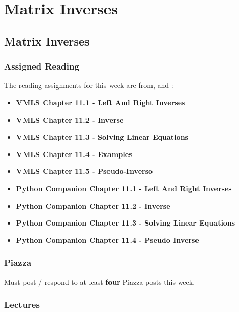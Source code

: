 \clearpage

\renewcommand{\ChapTitle}{Matrix Inverses}
\renewcommand{\SectionTitle}{Matrix Inverses}

\chapter{\ChapTitle}
\section{\SectionTitle}

\subsection{Assigned Reading}

The reading assignments for this week are from, \VMLS \hspace*{1pt} and \PyCap:

\begin{itemize}
    \item \textbf{VMLS Chapter 11.1 - Left And Right Inverses}
    \item \textbf{VMLS Chapter 11.2 - Inverse}
    \item \textbf{VMLS Chapter 11.3 - Solving Linear Equations}
    \item \textbf{VMLS Chapter 11.4 - Examples}
    \item \textbf{VMLS Chapter 11.5 - Pseudo-Inverso}
    \item \textbf{Python Companion Chapter 11.1 - Left And Right Inverses}
    \item \textbf{Python Companion Chapter 11.2 - Inverse}
    \item \textbf{Python Companion Chapter 11.3 - Solving Linear Equations}
    \item \textbf{Python Companion Chapter 11.4 - Pseudo Inverse}
\end{itemize}

\subsection{Piazza}

Must post / respond to at least \textbf{four} Piazza posts this week.

\subsection{Lectures}

